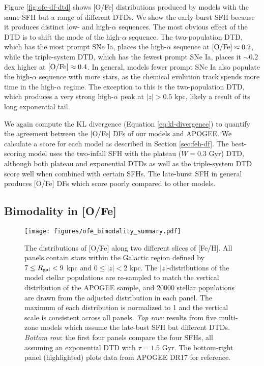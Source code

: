 \documentclass[twocolumn,twocolappendix,linenumbers,trackchanges]{aastex631}
\begin{document}
Figure \ref{fig:ofe-df-dtd} shows [O/Fe] distributions produced by models with the same SFH but a range of different DTDs. We show the early-burst SFH because it produces distinct low- and high-$\alpha$ sequences. The most obvious effect of the DTD is to shift the mode of the high-$\alpha$ sequence. The two-population DTD, which has the most prompt SNe Ia, places the high-$\alpha$ sequence at ${\rm [O/Fe]}\approx 0.2$, while the triple-system DTD, which has the fewest prompt SNe Ia, places it $\sim0.2$ dex higher at ${\rm [O/Fe]}\approx0.4$. In general, models fewer prompt SNe Ia also populate the high-$\alpha$ sequence with more stars, as the chemical evolution track spends more time in the high-$\alpha$ regime. The exception to this is the two-population DTD, which produces a very strong high-$\alpha$ peak at $|z|>0.5$ kpc, likely a result of its long exponential tail.

We again compute the KL divergence (Equation \ref{eq:kl-divergence}) to quantify the agreement between the [O/Fe] DFs of our models and APOGEE. We calculate a score for each model as described in Section \ref{sec:feh-df}. The best-scoring model uses the two-infall SFH with the plateau ($W=0.3$ Gyr) DTD, although both plateau and exponential DTDs as well as the triple-system DTD score well when combined with certain SFHs. The late-burst SFH in general produces [O/Fe] DFs which score poorly compared to other models.

\subsection{Bimodality in [O/Fe]}
\label{sec:bimodality}

\begin{figure*}
    \centering
    \texttt{[image: figures/ofe\_bimodality\_summary.pdf]}
    \caption{The distributions of [O/Fe] along two different slices of [Fe/H]. 
    All panels contain stars within the Galactic region defined by $7\leq R_{\rm gal}<9$ kpc and $0\leq|z|<2$ kpc. The $|z|$-distributions of the model stellar populations are re-sampled to match the vertical distribution of the APOGEE sample, and \num{20000} stellar populations are drawn from the adjusted distribution in each panel. The maximum of each distribution is normalized to 1 and the vertical scale is consistent across all panels.
    \textit{Top row:} results from five multi-zone models which assume the late-bust SFH but different DTDs. \textit{Bottom row}: the first four panels compare the four SFHs, all assuming an exponential DTD with $\tau=1.5$ Gyr. The bottom-right panel (highlighted) plots data from APOGEE DR17 for reference.}
    \label{fig:ofe-bimodality}
\end{figure*}
\end{document}
